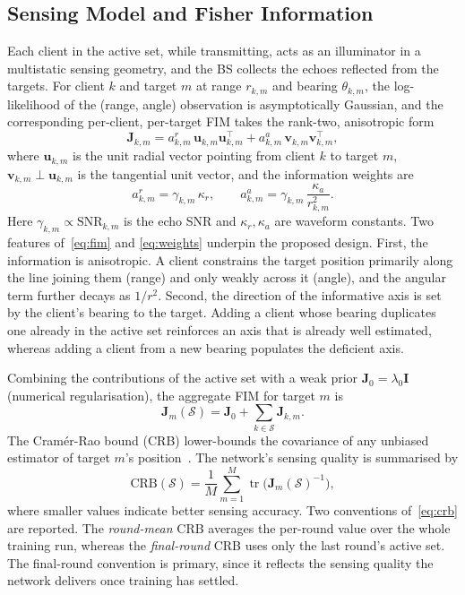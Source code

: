 \documentclass[lettersize,journal]{IEEEtran}
\newcommand{\bJ}{\bm{J}}
\newcommand{\calS}{\mathcal{S}}
\newcommand{\tr}{\operatorname{tr}}
\begin{document}
\subsection{Sensing Model and Fisher Information}\label{sec:sensing}
Each client in the active set, while transmitting, acts as an illuminator in a multistatic sensing geometry, and the BS collects the echoes reflected from the targets. For client $k$ and target $m$ at range $r_{k,m}$ and bearing $\theta_{k,m}$, the log-likelihood of the (range, angle) observation is asymptotically Gaussian, and the corresponding per-client, per-target FIM takes the rank-two, anisotropic form
\begin{equation}
\bJ_{k,m}=a^{r}_{k,m}\,\bm{u}_{k,m}\bm{u}_{k,m}^{\!\top}
+a^{a}_{k,m}\,\bm{v}_{k,m}\bm{v}_{k,m}^{\!\top},
\label{eq:fim}
\end{equation}
where $\bm{u}_{k,m}$ is the unit radial vector pointing from client $k$ to target $m$, $\bm{v}_{k,m}\perp\bm{u}_{k,m}$ is the tangential unit vector, and the information weights are
\begin{equation}
a^{r}_{k,m}=\gamma_{k,m}\,\kappa_{r},
\qquad
a^{a}_{k,m}=\gamma_{k,m}\,\frac{\kappa_{a}}{r_{k,m}^{2}} .
\label{eq:weights}
\end{equation}
Here $\gamma_{k,m}\propto\text{SNR}_{k,m}$ is the echo SNR and $\kappa_{r},\kappa_{a}$ are waveform constants. Two features of~\eqref{eq:fim} and \eqref{eq:weights} underpin the proposed design. First, the information is anisotropic. A client constrains the target position primarily along the line joining them (range) and only weakly across it (angle), and the angular term further decays as $1/r^2$. Second, the direction of the informative axis is set by the client's bearing to the target. Adding a client whose bearing duplicates one already in the active set reinforces an axis that is already well estimated, whereas adding a client from a new bearing populates the deficient axis.

Combining the contributions of the active set with a weak prior $\bJ_0=\lambda_0\bm{I}$ (numerical regularisation), the aggregate FIM for target $m$ is
\begin{equation}
\bJ_m(\calS)=\bJ_0+\sum_{k\in\calS}\bJ_{k,m}.
\label{eq:aggfim}
\end{equation}
The Cram\'er-Rao bound (CRB) lower-bounds the covariance of any unbiased estimator of target $m$'s position~\cite{kay1993,godrich2010}. The network's sensing quality is summarised by
\begin{equation}
\mathrm{CRB}(\calS)=\frac{1}{M}\sum_{m=1}^{M}\tr\!\big(\bJ_m(\calS)^{-1}\big),
\label{eq:crb}
\end{equation}
where smaller values indicate better sensing accuracy. Two conventions of~\eqref{eq:crb} are reported. The \emph{round-mean} CRB averages the per-round value over the whole training run, whereas the \emph{final-round} CRB uses only the last round's active set. The final-round convention is primary, since it reflects the sensing quality the network delivers once training has settled.
\end{document}
